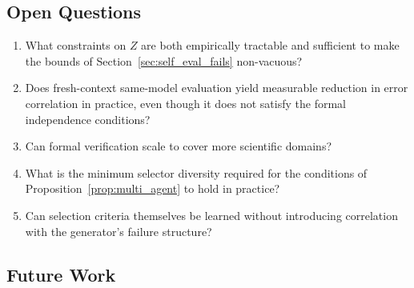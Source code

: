 \documentclass[11pt]{article}
\begin{document}
\subsection{Open Questions}

\begin{enumerate}
    \item What constraints on $Z$ are both empirically tractable and sufficient to make
    the bounds of Section~\ref{sec:self_eval_fails} non-vacuous?
    \item Does fresh-context same-model evaluation yield measurable reduction in error
    correlation in practice, even though it does not satisfy the formal independence
    conditions?
    \item Can formal verification scale to cover more scientific domains?
    \item What is the minimum selector diversity required for the conditions of
    Proposition~\ref{prop:multi_agent} to hold in practice?
    \item Can selection criteria themselves be learned without introducing correlation with
    the generator's failure structure?
\end{enumerate}

\subsection{Future Work}
\end{document}
